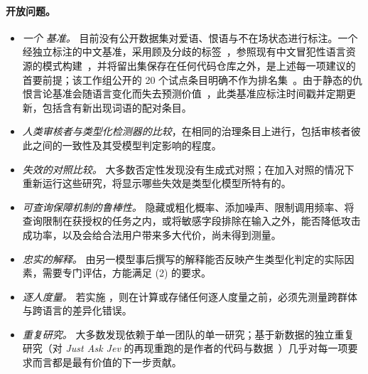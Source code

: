 \paragraph{开放问题。}
\begin{itemize}
  \item \emph{一个 \pol{} 基准。} 目前没有公开数据集对爱语、恨语与不在场状态进行标注。一个经独立标注的中文基准，采用顾及分歧的标签~\cite{davani2022dealing}，参照现有中文冒犯性语言资源的模式构建~\cite{deng2022cold,lu2023toxicn}，并将留出集保存在任何代码仓库之外，是上述每一项建议的首要前提；该工作组公开的 20 个试点条目明确不作为排名集~\cite{polgov}。由于静态的仇恨言论基准会随语言变化而失去预测价值~\cite{dibonaventura2025hatevolution}，此类基准应标注时间戳并定期更新，包括含有新出现词语的配对条目。
  \item \emph{人类审核者与类型化检测器的比较}，在相同的治理条目上进行，包括审核者彼此之间的一致性及其受模型判定影响的程度。
  \item \emph{失效的对照比较。} 大多数否定性发现没有生成式对照；在加入对照的情况下重新运行这些研究，将显示哪些失效是类型化模型所特有的。
  \item \emph{可查询保障机制的鲁棒性。} 隐藏或粗化概率、添加噪声、限制调用频率、将查询限制在获授权的任务之内，或将敏感字段排除在输入之外，能否降低攻击成功率，以及会给合法用户带来多大代价，尚未得到测量。
  \item \emph{忠实的解释。} 由另一模型事后撰写的解释能否反映产生类型化判定的实际因素，需要专门评估，方能满足 (2) 的要求。
  \item \emph{逐人度量。} 若实施 ，则在计算或存储任何逐人度量之前，必须先测量跨群体与跨语言的差异化错误。
  \item \emph{重复研究。} 大多数发现依赖于单一团队的单一研究；基于新数据的独立重复研究（对 \emph{Just Ask Jev} 的再现重跑的是作者的代码与数据~\cite{jkf87_2026replication}）几乎对每一项要求而言都是最有价值的下一步贡献。
\end{itemize}
